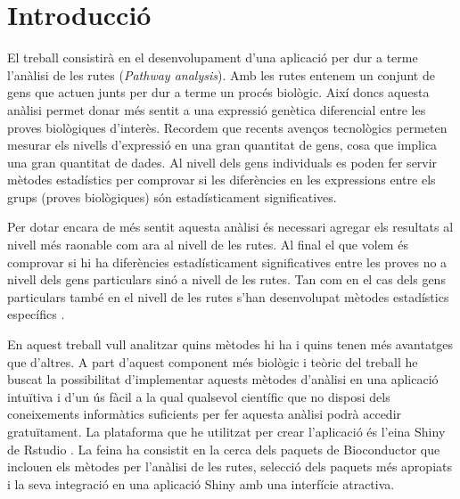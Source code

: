 

%
%
% 


\newenvironment{mykeithtabbing}[1]{%
\begin{tabular}{lp{0.9\hsize}}
}{%
\end{tabular}
}

\newcommand{\mybadgood}[2]{%
\begin{mykeithtabbing}
{}\emph{Bad:} & \sout{#1} \\
\emph{Good:} & #2 \\
\end{mykeithtabbing}
}



\chapter{Introducció}

El treball consistirà en el desenvolupament d'una aplicació per dur a terme l'anàlisi de les rutes (\textit{Pathway analysis}). Amb les rutes entenem un conjunt de gens que actuen junts per dur a terme un procés biològic. Així doncs aquesta anàlisi permet donar més sentit a una expressió genètica diferencial entre les proves biològiques d'interès. Recordem que recents avenços tecnològics permeten mesurar els nivells d'expressió en una gran quantitat de gens, cosa que implica una gran quantitat de dades. Al nivell dels gens individuals es poden fer servir mètodes estadístics per comprovar si les diferències en les expressions entre els grups (proves biològiques) són estadísticament significatives. 

Per dotar encara de més sentit aquesta anàlisi és necessari agregar els resultats al nivell més raonable com ara al nivell de les rutes. Al final el que volem és comprovar si hi ha diferències estadísticament significatives entre les proves no a nivell dels gens particulars sinó a nivell de les rutes. Tan com en el cas dels gens particulars també en el nivell de les rutes s'han desenvolupat mètodes estadístics específics \cite{khatri2012ten}. 

En aquest treball vull analitzar quins mètodes hi ha i quins tenen més avantatges que d'altres. A part d'aquest component més biològic i teòric del treball he buscat la possibilitat d'implementar aquests mètodes d'anàlisi en una aplicació intuïtiva i d'un ús fàcil a la qual qualsevol científic que no disposi dels coneixements informàtics suficients per fer aquesta anàlisi podrà accedir gratuïtament. La plataforma que he utilitzat per crear l'aplicació és l'eina Shiny de Rstudio \cite{Shiny}. La feina ha consistit en la cerca dels paquets de \gls{Bioconductor} que inclouen els mètodes per l'anàlisi de les rutes, selecció dels paquets més apropiats i la seva integració en una aplicació Shiny amb una interfície atractiva. 

